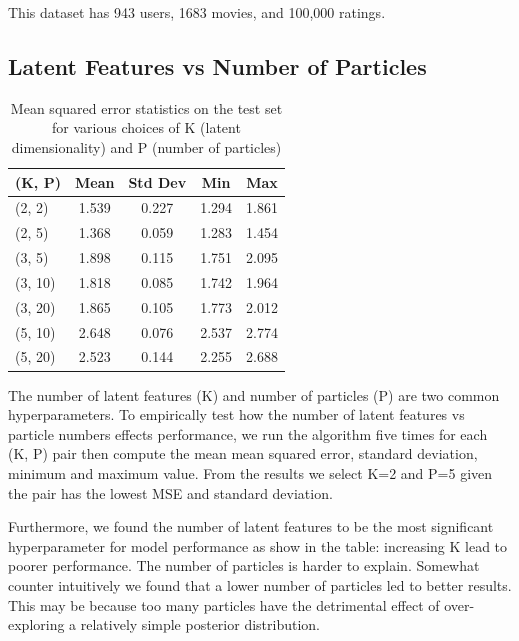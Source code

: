 \documentclass{article}
\begin{document}
This dataset has 943 users, 1683 movies, and 100,000 ratings.
\subsection{Latent Features vs Number of Particles}

\begin{table}[ht]
\caption{Mean squared error statistics on the test set for various choices of K
(latent dimensionality) and P (number of particles)}
\label{sample-table}
\vskip 0.15in
\begin{center}
\begin{small}
\begin{sc}
\begin{tabular}{lcccc}
\toprule
(K, P) & Mean & Std Dev & Min & Max \\
\midrule
(2, 2)  & 1.539 & 0.227 & 1.294 & 1.861 \\
(2, 5)  & 1.368 & 0.059 & 1.283 & 1.454 \\
(3, 5)  & 1.898 & 0.115 & 1.751 & 2.095 \\
(3, 10) & 1.818 & 0.085 & 1.742 & 1.964 \\
(3, 20) & 1.865 & 0.105 & 1.773 & 2.012 \\
(5, 10) & 2.648 & 0.076 & 2.537 & 2.774 \\
(5, 20) & 2.523 & 0.144 & 2.255 & 2.688 \\
\bottomrule
\end{tabular}
\end{sc}
\end{small}
\end{center}
\vskip -0.1in
\end{table}

The number of latent features (K) and number of particles (P) are two common hyperparameters. To empirically test how the number of latent features vs particle numbers effects performance, we run the algorithm five times for each (K, P) pair then compute the mean mean squared error, standard deviation, minimum and maximum value. From the results we select K=2 and P=5 given the pair has the lowest MSE and standard deviation.

Furthermore, we found the number of latent features to be the most significant hyperparameter for model performance as show in the table: increasing K lead to poorer performance. The number of particles is harder to explain. Somewhat counter intuitively we found that a lower number of particles led to better results. This may be because too many particles have the detrimental effect of over-exploring a relatively simple posterior distribution.
\end{document}
